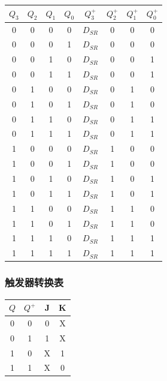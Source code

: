 \documentclass{article}
\begin{document}
\begin{table}[!hbp]
\centering
\begin{tabular}{|c|c|c|c||c|c|c|c|}
\hline
$Q_3$ & $Q_2$ & $Q_1$ & $Q_0$ & $Q_3^+$ & $Q_2^+$ & $Q_1^+$ & $Q_0^+$ \\
\hline
\hline
0 & 0 & 0 & 0 & $D_{SR}$ & 0 & 0 & 0 \\
\hline
0 & 0 & 0 & 1 & $D_{SR}$ & 0 & 0 & 0 \\
\hline
0 & 0 & 1 & 0 & $D_{SR}$ & 0 & 0 & 1 \\
\hline
0 & 0 & 1 & 1 & $D_{SR}$ & 0 & 0 & 1 \\
\hline
0 & 1 & 0 & 0 & $D_{SR}$ & 0 & 1 & 0 \\
\hline
0 & 1 & 0 & 1 & $D_{SR}$ & 0 & 1 & 0 \\
\hline
0 & 1 & 1 & 0 & $D_{SR}$ & 0 & 1 & 1 \\
\hline
0 & 1 & 1 & 1 & $D_{SR}$ & 0 & 1 & 1 \\
\hline
1 & 0 & 0 & 0 & $D_{SR}$ & 1 & 0 & 0 \\
\hline
1 & 0 & 0 & 1 & $D_{SR}$ & 1 & 0 & 0 \\
\hline
1 & 0 & 1 & 0 & $D_{SR}$ & 1 & 0 & 1 \\
\hline
1 & 0 & 1 & 1 & $D_{SR}$ & 1 & 0 & 1 \\
\hline
1 & 1 & 0 & 0 & $D_{SR}$ & 1 & 1 & 0 \\
\hline
1 & 1 & 0 & 1 & $D_{SR}$ & 1 & 1 & 0 \\
\hline
1 & 1 & 1 & 0 & $D_{SR}$ & 1 & 1 & 1 \\
\hline
1 & 1 & 1 & 1 & $D_{SR}$ & 1 & 1 & 1 \\
\hline
\end{tabular}
\end{table}

\subsubsection{触发器转换表}

\begin{table}[!hbp]
\centering
\begin{tabular}{|c|c||c|c|}
\hline
$Q$ & $Q^+$ & J & K \\
\hline
\hline
0 & 0 & 0 & X \\
\hline
0 & 1 & 1 & X \\
\hline
1 & 0 & X & 1 \\
\hline
1 & 1 & X & 0 \\
\hline
\end{tabular}
\end{table}
\end{document}
